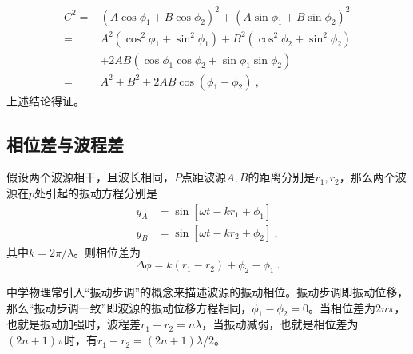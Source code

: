 \begin{equation}
\begin{aligned}
C^2
= & \left(A \cos \phi_1+B \cos \phi_2\right)^2+\left(A \sin \phi_1+B \sin \phi_2\right)^2 \\
= & A^2\left(\cos ^2 \phi_1+\sin ^2 \phi_1\right)+B^2\left(\cos ^2 \phi_2+\sin ^2 \phi_2\right) \\
& +2 A B\left(\cos \phi_1 \cos \phi_2+\sin \phi_1 \sin \phi_2\right) \\
= & A^2+B^2+2 A B \cos \left(\phi_1-\phi_2\right)~,
\end{aligned}
\end{equation}
上述结论得证。
\subsection{相位差与波程差}
假设两个波源相干，且波长相同，$P$点距波源$A,B$的距离分别是$r_1,r_2$，那么两个波源在$p$处引起的振动方程分别是
\begin{equation}
\begin{aligned}
y_A&=\sin[\omega t-kr_1+\phi_1]\\
y_B&=\sin[\omega t-kr_2+\phi_2]~,
\end{aligned}
\end{equation}
其中$k=2\pi/\lambda$。则相位差为
\begin{equation}
\Delta\phi=k(r_1-r_2)+\phi_2-\phi_1~.
\end{equation}

中学物理常引入“振动步调”的概念来描述波源的振动相位。振动步调即振动位移，那么“振动步调一致”即波源的振动位移方程相同，$\phi_1-\phi_2=0$。当相位差为$2n\pi$，也就是振动加强时，波程差$r_1-r_2=n\lambda$，当振动减弱，也就是相位差为$(2n+1)\pi$时，有$r_1-r_2=(2n+1)\lambda/2$。

